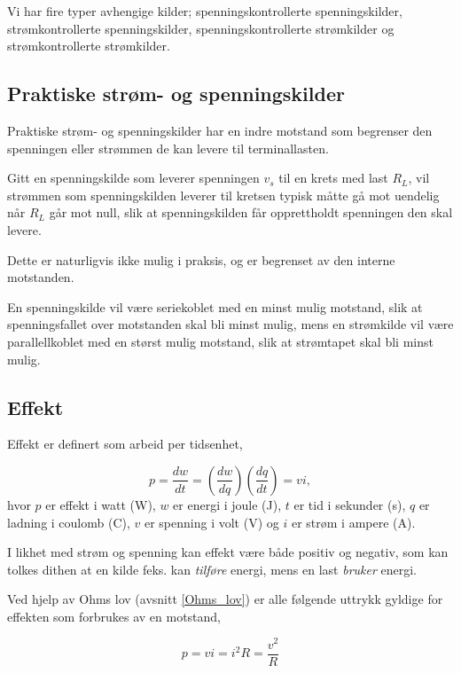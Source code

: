 \documentclass[norsk, a4paper, 12pt, twoside, titlepage]{article}
\begin{document}
Vi har fire typer avhengige kilder; spenningskontrollerte
spenningskilder, strømkontrollerte spenningskilder,
spenningskontrollerte strømkilder og strømkontrollerte strømkilder.

\subsection{Praktiske strøm- og spenningskilder}
Praktiske strøm- og spenningskilder har en indre motstand som
begrenser den spenningen eller strømmen de kan levere til
terminallasten.

Gitt en spenningskilde som leverer spenningen $v_{s}$ til en krets med
last $R_{L}$, vil strømmen som spenningskilden leverer til kretsen
typisk måtte gå mot uendelig når $R_{L}$ går mot null, slik at
spenningskilden får opprettholdt spenningen den skal levere.

Dette er naturligvis ikke mulig i praksis, og er begrenset av den
interne motstanden.

En spenningskilde vil være seriekoblet med en minst mulig motstand,
slik at spenningsfallet over motstanden skal bli minst mulig, mens en
strømkilde vil være parallellkoblet med en størst mulig motstand,
slik at strømtapet skal bli minst mulig.

\subsection{Effekt}
Effekt er definert som arbeid per tidsenhet,

\begin{equation}
p = \frac{dw}{dt} = \left(\frac{dw}{dq}\right) \left(\frac{dq}{dt}\right) = vi,
\end{equation}
hvor $p$ er effekt i watt (W), $w$ er energi i joule (J), $t$ er tid i
sekunder (s), $q$ er ladning i coulomb (C), $v$ er spenning i volt (V) og
$i$ er strøm i ampere (A).

I likhet med strøm og spenning kan effekt være både positiv og
negativ, som kan tolkes dithen at en kilde feks. kan \emph{tilføre} energi,
mens en last \emph{bruker} energi.

Ved hjelp av Ohms lov (avsnitt \ref{Ohms_lov}) er alle følgende
uttrykk gyldige for effekten som forbrukes av en motstand,

\begin{equation}
p = vi = i^{2}R = \frac{v^{2}}{R}
\end{equation}
\end{document}

